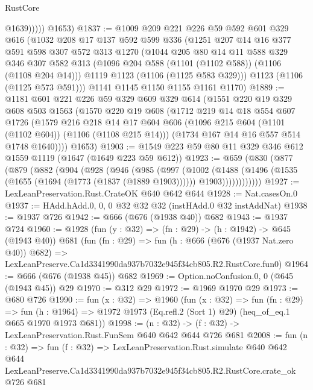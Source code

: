 \begin{lexlean}{RustCore}
\begin{coremodule}
                @1639)))))
      @1653)
@1837 := @1009
    @209
    @221
    @226
    @59
    @592
    @601
    @329
    @616
    (@1032
      @208
      @17
      @137
      @592
      @599
      @336
      (@1251
        @207
        @14
        @16
        @377
        @591
        @598
        @307
        @572
        @313
        @1270
        (@1044
          @205
          @80
          @14
          @11
          @588
          @329
          @346
          @307
          @582
          @313
          (@1096 @204 @588 (@1101 (@1102 @588)) (@1106 (@1108 @204 @14)))
          @1119
          @1123
          (@1106 (@1125 @583 @329)))
        @1123
        (@1106 (@1125 @573 @591)))
      @1141
      @1145
      @1150
      @1155
      @1161
      @1170)
@1889 := @1181
    @601
    @221
    @226
    @59
    @329
    @609
    @329
    @614
    (@1551
      @220
      @19
      @329
      @608
      @503
      @1563
      (@1570
        @220
        @19
        @608
        (@1712
          @219
          @14
          @18
          @554
          @607
          @1726
          (@1579
            @216
            @218
            @14
            @17
            @604
            @606
            (@1096 @215 @604 (@1101 (@1102 @604)) (@1106 (@1108 @215 @14)))
            (@1734 @167 @14 @16 @557 @514 @1748 @1640))))
      @1653)
@1903 := @1549 @223 @59 @80 @11 @329 @346 @612 @1559 @1119 (@1647 (@1649 @223 @59 @612))
@1923 := @659
    (@830
      (@877
        (@879
          (@882
            (@904
              (@928
                (@946
                  (@985
                    (@997
                      (@1002
                        (@1488
                          (@1496
                            (@1535 (@1655 (@1694 (@1773 (@1837 (@1889 @1903))))))
                            @1903))))))))))))
@1927 := LexLeanPreservation.Rust.CrateOK @640 @642 @644
@1928 := Nat.casesOn.{0}
@1937 := HAdd.hAdd.{0, 0, 0} @32 @32 @32 (instHAdd.{0} @32 instAddNat)
@1938 := @1937 @726
@1942 := @666 (@676 (@1938 @40)) @682
@1943 := @1937 @724
@1960 := @1928
    (fun (y : @32) => (fn : @29) -> (h : @1942) -> @645 (@1943 @40))
    @681
    (fun (fn : @29) =>
    fun (h : @666 (@676 (@1937 Nat.zero @40)) @682) =>
    LexLeanPreserve.Ca1d3341990da937b7032e945f34cb805.R2.RustCore.fun0)
@1964 := @666 (@676 (@1938 @45)) @682
@1969 := Option.noConfusion.{0, 0} (@645 (@1943 @45)) @29
@1970 := @312 @29
@1972 := @1969 @1970 @29
@1973 := @680 @726
@1990 := fun (x : @32) =>
  @1960
    (fun (x : @32) =>
    fun (fn : @29) =>
    fun (h : @1964) => @1972 @1973 (Eq.refl.{2} (Sort 1) @29) (heq_of_eq.{1} @665 @1970 @1973 @681))
@1998 := (n : @32) -> (f : @32) -> LexLeanPreservation.Rust.FunSem @640 @642 @644 @726 @681
@2008 := fun (n : @32) =>
  fun (f : @32) =>
  LexLeanPreservation.Rust.simulate
    @640
    @642
    @644
    LexLeanPreserve.Ca1d3341990da937b7032e945f34cb805.R2.RustCore.crate_ok
    @726
    @681
\end{coremodule}
\end{lexlean}
